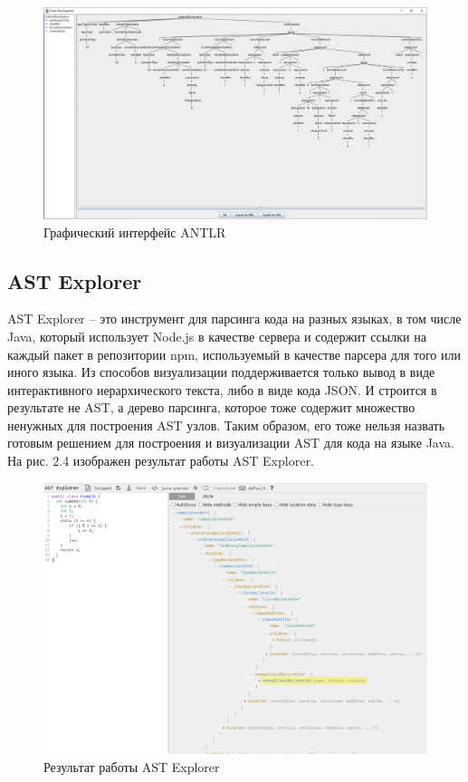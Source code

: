\begin{figure}[h]
	\center
	\includegraphics [scale=0.38] {my_folder/images/my/8}
	\caption{Графический интерфейс ANTLR}
	\label{fig:8}
\end{figure}

\subsection{AST Explorer} \label{ch2:subsec-title-abbr}
AST Explorer – это инструмент для парсинга кода на разных языках, в том числе Java, который использует Node.js в качестве сервера и содержит ссылки на каждый пакет в репозитории npm, используемый в качестве парсера для того или иного языка.
Из способов визуализации поддерживается только вывод в виде интерактивного иерархического текста, либо в виде кода JSON. И строится в результате не AST, а дерево парсинга, которое тоже содержит множество ненужных для построения AST узлов.
Таким образом, его тоже нельзя назвать готовым решением для построения и визуализации AST для кода на языке Java. На рис. 2.4 изображен результат работы AST Explorer.
\newpage

\begin{figure}[h]
	\center
	\includegraphics [scale=1] {my_folder/images/my/9}
	\caption{Результат работы AST Explorer}
	\label{fig:9}
\end{figure}

